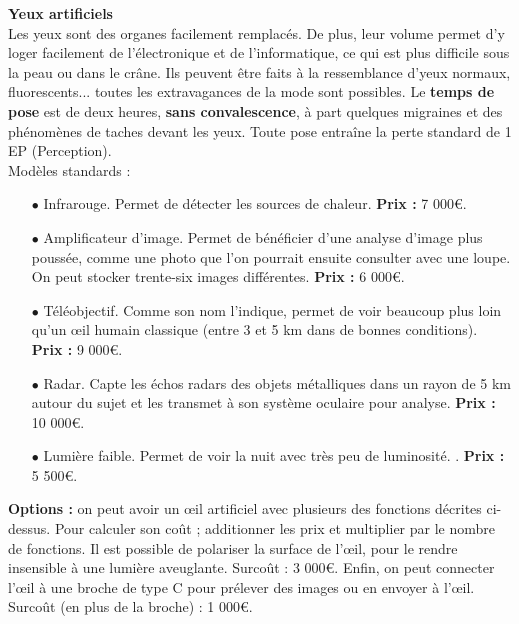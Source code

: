 \documentclass[11pt,twoside,a4paper]{article}
\begin{document}
\begin{multicols*}{2}
\textbf{Yeux artificiels}~\\
Les yeux sont des organes facilement remplac{\'e}s. De plus, leur volume permet d'y loger facilement de l'{\'e}lectronique et de l'informatique, ce qui est plus difficile sous la peau ou dans le cr{\^a}ne. Ils peuvent {\^e}tre faits {\`a} la ressemblance d'yeux normaux, fluorescents... toutes les extravagances de la mode sont possibles. Le \textbf{temps de pose} est de deux heures, \textbf{sans convalescence}, {\`a} part quelques migraines et des ph{\'e}nom{\`e}nes de taches devant les yeux. Toute pose entra{\^i}ne la perte standard de 1 EP (Perception). ~\\
Mod{\`e}les standards : 
\begin{itemize}
	\footnotesize
	\item[$\bullet$] Infrarouge. Permet de d{\'e}tecter les sources de chaleur. \textbf{Prix : }7 000\euro . 
	\item[$\bullet$] Amplificateur d'image. Permet de b{\'e}n{\'e}ficier d'une analyse d'image plus pouss{\'e}e, comme une photo que l'on pourrait ensuite consulter avec une loupe. On peut stocker trente-six images diff{\'e}rentes. \textbf{Prix : }6 000\euro . 
	\item[$\bullet$] T{\'e}l{\'e}objectif. Comme son nom l'indique, permet de voir beaucoup plus loin qu'un \oe il humain classique (entre 3 et 5 km dans de bonnes conditions). \textbf{Prix : }9 000\euro . 
	\item[$\bullet$] Radar. Capte les {\'e}chos radars des objets m{\'e}talliques dans un rayon de 5 km autour du sujet et les transmet {\`a} son syst{\`e}me oculaire pour analyse. \textbf{Prix : }10 000\euro . 
	\item[$\bullet$] Lumi{\`e}re faible. Permet de voir la nuit avec tr{\`e}s peu de luminosit{\'e}. . \textbf{Prix : }5 500\euro . 
\end{itemize}
{\small 
	\textbf{Options : }on peut avoir un \oe il artificiel avec plusieurs des fonctions d{\'e}crites ci-dessus. Pour calculer son co{\^u}t ; additionner les prix et multiplier par le nombre de fonctions. Il est possible de polariser la surface de l'\oe il, pour le rendre insensible {\`a} une lumi{\`e}re aveuglante. Surco{\^u}t : 3 000\euro . Enfin, on peut connecter l'\oe il {\`a} une broche de type C pour pr{\'e}lever des images ou en envoyer {\`a} l'\oe il. Surco{\^u}t (en plus de la broche) : 1 000\euro . %
} ~\\


\end{multicols*}
\end{document}
